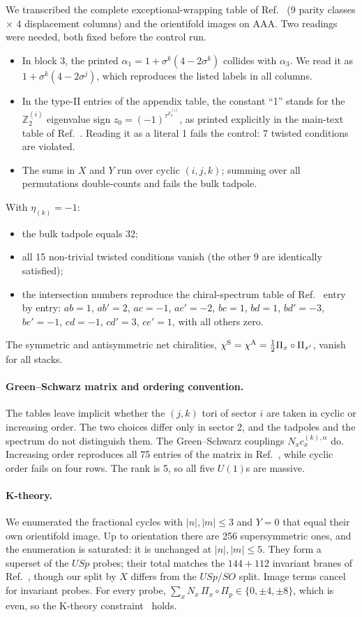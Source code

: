 \documentclass[aps,prd,twocolumn,superscriptaddress,nofootinbib,showkeys]{revtex4-2}
\begin{document}
We transcribed the complete exceptional-wrapping table of Ref.~\cite{HRS} (9 parity classes $\times$ 4 displacement columns) and the orientifold images on AAA. Two readings were needed, both fixed before the control run.
\begin{itemize}
\item In block 3, the printed $\alpha_1=1+\sigma^k(4-2\sigma^k)$ collides with $\alpha_3$. We read it as $1+\sigma^k(4-2\sigma^j)$, which reproduces the listed labels in all columns.
\item In the type-II entries of the appendix table, the constant ``1'' stands for the $\mathbb Z_2^{(i)}$ eigenvalue sign $z_0=(-1)^{\tau^{\mathbb Z_2^{(i)}}}$, as printed explicitly in the main-text table of Ref.~\cite{HRS}. Reading it as a literal 1 fails the control: 7 twisted conditions are violated.
\item The sums in $X$ and $Y$ run over cyclic $(i,j,k)$; summing over all permutations double-counts and fails the bulk tadpole.
\end{itemize}
With $\eta_{(k)}=-1$:
\begin{itemize}
\item the bulk tadpole equals 32;
\item all 15 non-trivial twisted conditions vanish (the other 9 are identically satisfied);
\item the intersection numbers reproduce the chiral-spectrum table of Ref.~\cite{HRS} entry by entry: $ab{=}1$, $ab'{=}2$, $ac{=}{-1}$, $ac'{=}{-2}$, $bc{=}1$, $bd{=}1$, $bd'{=}{-3}$, $be'{=}{-1}$, $cd{=}{-1}$, $cd'{=}3$, $ce'{=}1$, with all others zero.
\end{itemize}
The symmetric and antisymmetric net chiralities, $\chi^{\rm S}=\chi^{\rm A}=\tfrac12\Pi_x\circ\Pi_{x'}$, vanish for all stacks.

\paragraph{Green--Schwarz matrix and ordering convention.} The tables leave implicit whether the $(j,k)$ tori of sector $i$ are taken in cyclic or increasing order. The two choices differ only in sector 2, and the tadpoles and the spectrum do not distinguish them. The Green--Schwarz couplings $N_xc^{(k),\alpha}_x$ do. Increasing order reproduces all 75 entries of the matrix in Ref.~\cite{HRS}, while cyclic order fails on four rows. The rank is 5, so all five $U(1)$s are massive.

\paragraph{K-theory.} We enumerated the fractional cycles with $|n|,|m|\le3$ and $Y=0$ that equal their own orientifold image. Up to orientation there are 256 supersymmetric ones, and the enumeration is saturated: it is unchanged at $|n|,|m|\le5$. They form a superset of the $USp$ probes; their total matches the $144+112$ invariant branes of Ref.~\cite{HRS}, though our split by $X$ differs from the $USp/SO$ split. Image terms cancel for invariant probes. For every probe, $\sum_x N_x\,\Pi_x\circ\Pi_p\in\{0,\pm4,\pm8\}$, which is even, so the K-theory constraint~\cite{Uranga} holds.
\end{document}
